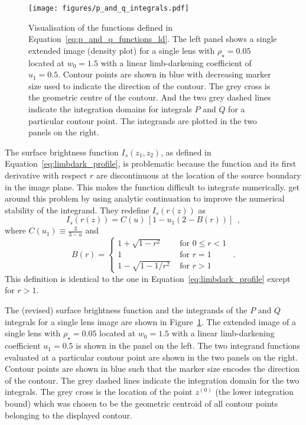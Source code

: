 \documentclass[12pt,dvipsnames]{report}
\newcommand{\hquad}{~~}
\begin{document}
\begin{figure}[t]
    \begin{centering}
        \texttt{[image: figures/p\_and\_q\_integrals.pdf]}
        \caption{Visualisation of the functions defined in Equation~\ref{eq:p_and_q_functions_ld}.
        The left panel shows a single extended image (density plot) for a single lens with $\rho_\star=0.05$ 
        located at $w_0=1.5$ with a linear limb-darkening coefficient of $u_1=0.5$. Contour points
        are shown in blue with decreasing marker size used to indicate the direction of the 
        contour. The grey cross is the geometric centre of the contour. And the two grey 
        dashed lines indicate the integration domains for integrals $P$ and $Q$ for a particular
        contour point. The integrands are plotted in the two panels on the right.}
    \label{fig:p_and_q_integrals}
    \end{centering}
\end{figure}

The surface brightness function $I_s(z_1,z_2)$, as defined in Equation~\ref{eq:limbdark_profile},
is problematic because the function and its first derivative with respect $r$ are
discontinuous at the location of the source boundary in the image plane. 
This makes the function difficult to integrate numerically.
\citet{1998A&A...333L..79D,2007MNRAS.377.1679D} get around this problem by using analytic 
continuation to improve the numerical stability of the integrand. They redefine 
$I_s(r(z))$ as
\begin{equation}
    I_s(r(z))=C(u)\,\left[1-u_1\left(2-B(r)\right)\right]
    \hquad,
\end{equation}
where $C(u_1)\equiv\frac{3}{3-u}$  and
\begin{equation}
B(r)= 
\begin{cases}
    1+\sqrt{1-r^{2}} & \text { for } 0 \leq r<1 \\
     1 & \text { for } r=1 \\
      1-\sqrt{1-1 / r^{2}} & \text { for } r>1
    \end{cases}
    \label{eq:limbdark_profile_cont}
    \hquad .
\end{equation}
This definition is identical to the one in Equation~\ref{eq:limbdark_profile} 
except for $r>1$. 

The (revised) surface brightness function and the integrands of the $P$ and $Q$ integrals
for a single lens image are shown in Figure~\ref{fig:p_and_q_integrals}. The extended image
of a single lens with $\rho_\star=0.05$ located at $w_0=1.5$ with a 
linear limb-darkening coefficient $u_1=0.5$  is shown in the panel on the left.
The two integrand functions evaluated at a particular contour point  are shown
in the two panels on the right. Contour points are shown in blue such that the marker size 
encodes the direction of the contour. The grey dashed lines indicate the integration domain for the 
two integrals. The grey cross is the location of the point $z^{(0)}$ (the lower integration
bound) which was chosen to be the geometric centroid of all contour points belonging to the 
displayed contour. 
\end{document}
